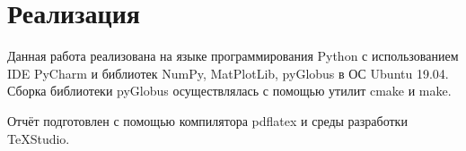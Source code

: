 \section{Реализация}
Данная работа реализована на языке программирования Python с использованием IDE PyCharm и библиотек NumPy, MatPlotLib, pyGlobus в ОС Ubuntu 19.04. Сборка библиотеки pyGlobus осуществлялась с помощью утилит cmake и make.

Отчёт подготовлен с помощью компилятора pdflatex и среды разработки TeXStudio.